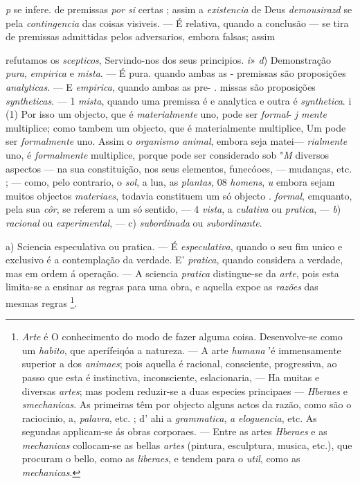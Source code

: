 \emph{p} se infere. de premissas \emph{por si} certas ; assim a \emph{existencia} de Deus \emph{demousirazd} se pela \emph{contingencia} das coisas visiveis. --- É relativa, quando a conclusão --- se tira de premissas admittidas pelos adversarios, embora falsas; assim

refutamos os \emph{scepticos}, Servindo-nos dos seus principios. \emph{i}» \emph{d}) Demonstração \emph{pura}, \emph{empirica} e \emph{mista}. --- É pura. quando ambas as - premissas são proposições \emph{analyticas}. --- E \emph{empirica}, quando ambas as pre- . missas são proposições \emph{syntheticas}. --- 1 \emph{mista}, quando uma premissa é e analytica e outra é \emph{synthetica}. i (1) Por isso um objecto, que é \emph{materialmente} uno, pode ser \emph{formal}- \textbar{}\emph{j mente} multiplice; como tambem um objecto, que é materialmente multiplice, \textbar{} Um pode ser \emph{formalmente} uno. Assim o \emph{organismo animal}, embora seja matei--- \emph{rialmente} uno, é \emph{formalmente} multiplice, porque pode ser considerado sob "\emph{M} diversos aspectos --- na sua constituição, nos seus elementos, funecóoes, \textbar{}--- mudanças, etc. ; --- como, pelo contrario, o \emph{sol}, a lua, as \emph{plantas}, 08 \emph{homens}, \emph{u} embora sejam muitos objectos \emph{materiaes}, todavia constituem um só objecto . \emph{formal}, emquanto, pela sua \emph{côr}, se referem a um só sentido, --- 4 \emph{vista}, a   \emph{culativa} ou \emph{pratica}, --- \emph{b}) \emph{racional} ou \emph{experimental}, --- c) \emph{subordinada} ou \emph{subordinante}.

a) Sciencia especulativa ou pratica. --- É \emph{especulativa}, quando o seu fim unico e exclusivo é a contemplação da verdade. E' \emph{pratica}, quando considera a verdade, mas em ordem á operação. --- A sciencia \emph{pratica} distingue-se da \emph{arte}, pois esta limita-se a ensinar as regras para uma obra, e aquella expoe as \emph{razões} das mesmas regras \footnote{\emph{Arte} é O conhecimento do modo de fazer alguma coisa. Desenvolve-se como um \emph{habito}, que aperífeiqóa a natureza. --- A arte \emph{humana} 'é immensamente superior a dos \emph{animaes}; pois aquella é racional, consciente, progressiva, ao passo que esta é instinctiva, inconsciente, eslacionaria, --- Ha muitas e diversas \emph{artes}; mas podem reduzir-se a duas especies principaes --- \emph{Hberaes} e \emph{smechanicas}. As primeiras têm por objecto alguns actos da razão, como são o raciocinio, a, \emph{palavra}, etc. ; d' ahi a \emph{grammatica}, \emph{a eloguencia}, etc. As segundas applicam-se ás obras corporaes. --- Entre as artes \emph{Hberaes} e as \emph{mechanicas} collocam-se as bellas \emph{artes} (pintura, esculptura, musica, etc.), que procuram o bello, como as \emph{liberaes}, e tendem para o \emph{util}, como as \emph{mechanicas}.}.

